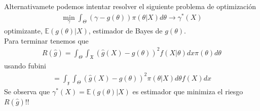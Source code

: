 \documentclass[10pt]{article}
\theoremstyle{plain}
\theoremstyle{definition}
\begin{document}
\begin{etaremune}
Alternativamete podemos intentar resolver el siguiente problema de optimización
\begin{align*}
\min_{\gamma}\int_{\Theta}(\gamma-g(\theta))\pi(\theta|X)d\theta \rightarrow \gamma^{*}(X)
\end{align*}
optimizante, $\mathbb{E}(g(\theta)|X)$, estimador de Bayes de $g(\theta)$.\\

Para terminar tenemos que
\begin{align*}
R(\hat{g}) = \int_{\Theta}\int_{\mathfrak{X}}(\hat{g}(X)-g(\theta))^2f(X|\theta)dx\pi(\theta)d\theta
\end{align*}
usando fubini
\begin{align*}
= \int_{\mathfrak{x}}\int_{\Theta}(\hat{g}(X)-g(\theta))^2\pi(\theta|X)d\theta f(X)dx
\end{align*}
Se observa que $\gamma^*(X) = \mathbb{E}(g(\theta)|X)$ es estimador que minimiza el riesgo $R(\hat{g})$!!
\end{etaremune}
\end{document}

